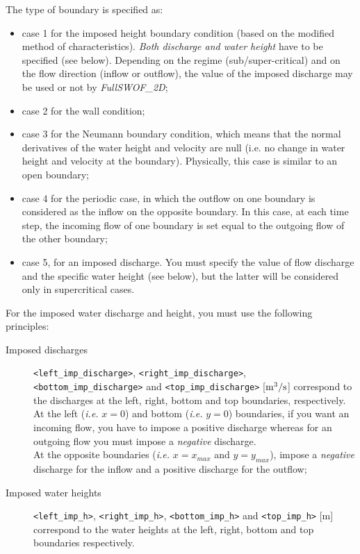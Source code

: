 \documentclass[a4paper, 11pt]{article}
\newcommand{\FullSWOF}{\emph{FullSWOF\_2D}}
\begin{document}
The type of boundary is specified as:
\begin{itemize}
	\item case 1 for the imposed height boundary condition (based on the modified method of characteristics).
		\emph{Both discharge and water height} have to be specified (see below).
		Depending on the regime (sub/super-critical) and on the flow direction (inflow or outflow), the value of the imposed discharge may be used or not by \FullSWOF;
	\item case 2 for the wall condition; 
	\item case 3 for the Neumann boundary condition, which means that the normal derivatives of the water height and velocity are null (i.e. no change in water height and velocity at the boundary). 
		Physically, this case is similar to an open boundary;
	\item case 4 for the periodic case, in which the outflow on one boundary is considered as the inflow on the opposite boundary. In this case, at each time step, 
the incoming flow of one boundary is set equal to the outgoing flow of the other boundary;
	\item case 5, for an imposed discharge. You must specify the value of flow discharge and the specific water height (see below), 
	but the latter will be considered only in supercritical cases.
\end{itemize}

For the imposed water discharge and height, you must use the following principles:
\begin{description}
	\item[Imposed discharges] \sloppy \texttt{<left\_imp\_discharge>}, \texttt{<right\_imp\_discharge>}, \texttt{<bottom\_imp\_discharge>} and \texttt{<top\_imp\_discharge>} [$\rm m^{3}/s$] correspond to the discharges at the left, right, bottom and top boundaries, respectively.
		At the left (\textit{i.e.} $x=0$) and bottom (\textit{i.e.} $y=0$) boundaries, if you want an incoming flow, you have to impose a positive discharge whereas for an outgoing flow 
		you must impose a \textit{negative} discharge. \\At the opposite boundaries (\textit{i.e.} $x=x_{max}$ and $y=y_{max}$), impose a \textit{negative} discharge 
		for the inflow and a positive discharge for the outflow;
	\item[Imposed water heights] \texttt{<left\_imp\_h>}, \texttt{<right\_imp\_h>}, \texttt{<bottom\_imp\_h>} and \texttt{<top\_imp\_h>} [m] correspond to the water heights at the left, right, bottom and top boundaries respectively.
\end{description}
\end{document}
